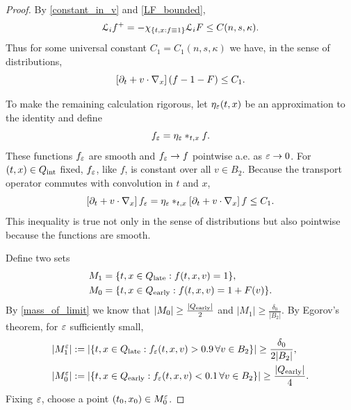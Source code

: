 \begin{proof}
By \eqref{constant_in_v} and \eqref{LF_bounded},
\[ \mathcal{L}_i f^+ = - \chi_{\{t,x:f\equiv 1\}} \mathcal{L}_i F \leq C(n,s,\kappa). \]
Thus for some universal constant $C_1 = C_1(n,s,\kappa)$ we have, in the sense of distributions,
\[ \left[ \partial_t + v\cdot \nabla_x \right] \left( f - 1 - F \right) \leq C_1. \]


To make the remaining calculation rigorous, let $\eta_\varepsilon(t,x)$ be an approximation to the identity and define 
\[ f_\varepsilon = \eta_\varepsilon \ast_{t,x} f. \]
These functions $f_\varepsilon$ are smooth and $f_\varepsilon \to f$ pointwise a.e. as $\varepsilon \to 0$.  For $(t,x)\in {Q_\textrm{int}}$ fixed, $f_\varepsilon$, like $f$, is constant over all $v \in B_2$.  Because the transport operator commutes with convolution in $t$ and $x$,
\[ \left[ \partial_t + v\cdot \nabla_x \right] f_\varepsilon = \eta_\varepsilon \ast_{t,x} \left[ \partial_t + v\cdot \nabla_x \right] f \leq C_1. \]
This inequality is true not only in the sense of distributions but also pointwise because the functions are smooth.  

Define two sets
\begin{align*} 
M_1 &= \{t,x \in {Q_\textrm{late}}: f(t,x,v) = 1 \}, \\
M_0 &= \{t,x \in {Q_\textrm{early}}: f(t,x,v) = 1+F(v) \}. \\
\end{align*}
By \eqref{mass_of_limit} we know that $|M_0| \geq \frac{|{Q_\textrm{early}}|}{2}$ and $|M_1| \geq \frac{\delta_0}{|B_2|}$.  By Egorov's theorem, for $\varepsilon$ sufficiently small,
\begin{align}
|M_1^\varepsilon| &:= \left\lvert \{t,x \in {Q_\textrm{late}}: f_\varepsilon(t,x,v) > 0.9 \, \forall v \in B_2\} \right\rvert \geq \frac{\delta_0}{2|B_2|}, \label{size_of_M1eps} \\
|M_0^\varepsilon| &:= \left\lvert \{t,x \in {Q_\textrm{early}}: f_\varepsilon(t,x,v) < 0.1 \, \forall v \in B_2\} \right\rvert \geq \frac{|{Q_\textrm{early}}|}{4}. \nonumber
\end{align}
Fixing $\varepsilon$, choose a point $(t_0,x_0) \in M_0^\varepsilon$.  




\end{proof}
